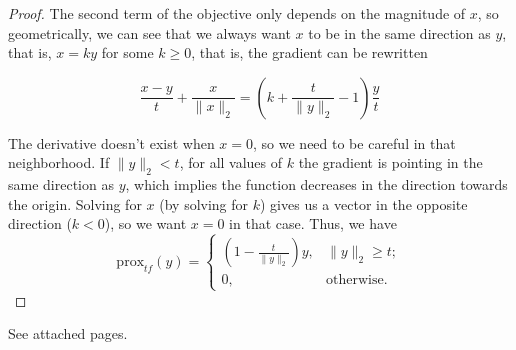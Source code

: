 \documentclass[11pt]{amsart}
\newcommand{\prox}{\mathrm{prox}}
\begin{document}
\begin{enumerate}
\begin{enumerate}
\begin{proof}
    The second term of the objective only depends on the magnitude of $x$, so
    geometrically, we can see that we always want $x$ to be in the same
    direction as $y$, that is, $x = ky$ for some $k \geq 0$, that is, the
    gradient can be rewritten

    \begin{equation*}
      \frac{x - y}{t} + \frac{x}{\|x\|_2}
      = \left(k + \frac{t}{\|y\|_2} - 1\right)\frac{y}{t}
    \end{equation*}
    
    The derivative doesn't exist when $x = 0$, so we need to be careful in that
    neighborhood. If $\|y\|_2 < t$, for all values of $k$ the gradient is
    pointing in the same direction as $y$, which implies the function decreases
    in the direction towards the origin. Solving for $x$ (by solving for $k$)
    gives us a vector in the opposite direction ($k < 0$), so we want $x = 0$ in
    that case. Thus, we have
    \begin{equation*}
      \prox_{t f}(y) = \begin{cases}
        \left(1 - \frac{t}{\|y\|_2}\right)y, & \|y\|_2 \geq t; \\
        0, & \text{otherwise.}
      \end{cases}
    \end{equation*}
  \end{proof}

\end{enumerate}
\end{enumerate}

\vskip 32pt
\bigskip

See attached pages.


\end{document}
